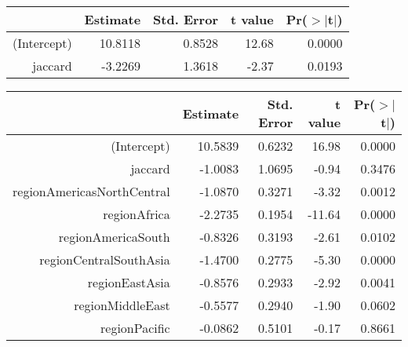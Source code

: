 \documentclass[10pt,a4paper]{article}
\begin{document}
\begin{table}[ht]
\centering
\begin{tabular}{rrrrr}
  \hline
 & Estimate & Std. Error & t value & Pr($>$$|$t$|$) \\ 
  \hline
(Intercept) & 10.8118 & 0.8528 & 12.68 & 0.0000 \\ 
  jaccard & -3.2269 & 1.3618 & -2.37 & 0.0193 \\ 
   \hline
\end{tabular}
\end{table}

\begin{table}[ht]
\centering
\begin{tabular}{rrrrr}
  \hline
 & Estimate & Std. Error & t value & Pr($>$$|$t$|$) \\ 
  \hline
(Intercept) & 10.5839 & 0.6232 & 16.98 & 0.0000 \\ 
  jaccard & -1.0083 & 1.0695 & -0.94 & 0.3476 \\ 
  regionAmericasNorthCentral & -1.0870 & 0.3271 & -3.32 & 0.0012 \\ 
  regionAfrica & -2.2735 & 0.1954 & -11.64 & 0.0000 \\ 
  regionAmericaSouth & -0.8326 & 0.3193 & -2.61 & 0.0102 \\ 
  regionCentralSouthAsia & -1.4700 & 0.2775 & -5.30 & 0.0000 \\ 
  regionEastAsia & -0.8576 & 0.2933 & -2.92 & 0.0041 \\ 
  regionMiddleEast & -0.5577 & 0.2940 & -1.90 & 0.0602 \\ 
  regionPacific & -0.0862 & 0.5101 & -0.17 & 0.8661 \\ 
   \hline
\end{tabular}
\end{table}
\end{document}
